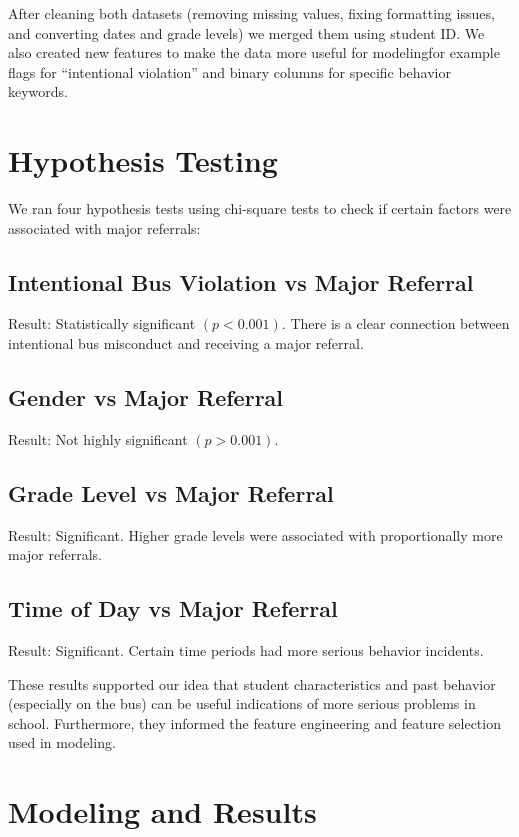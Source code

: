 \documentclass[letterpaper]{article}
\begin{document}
After cleaning both datasets (removing missing values, fixing formatting 
issues, and converting dates and grade levels) we merged them using 
student ID. We also created new features to make the data more useful 
for modelingfor example flags for ``intentional violation'' and binary 
columns for specific behavior keywords.

\section*{Hypothesis Testing}

We ran four hypothesis tests using chi-square tests to check if certain factors were associated with major referrals:

\subsection*{Intentional Bus Violation vs Major Referral}

Result: Statistically significant $(p < 0.001)$. There is a clear 
connection between intentional bus misconduct and receiving a major 
referral.

\subsection*{Gender vs Major Referral}

Result: Not highly significant $(p > 0.001)$.

\subsection*{Grade Level vs Major Referral}

Result: Significant. Higher grade levels were associated with 
proportionally more major referrals.


\subsection*{Time of Day vs Major Referral}

Result: Significant. Certain time periods had more serious behavior 
incidents.

These results supported our idea that student characteristics and past 
behavior (especially on the bus) can be useful indications of more serious 
problems in school. Furthermore, they informed the feature engineering 
and feature selection used in modeling.

\section*{Modeling and Results}
\end{document}

